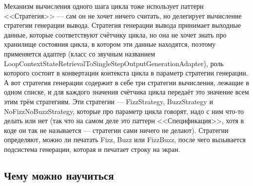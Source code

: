 \documentclass{../../text-style}
\begin{document}
Механизм вычисления одного шага цикла тоже использует паттерн <<Стратегия>> --- сам он не хочет ничего считать, но делегирует вычисление стратегии генерации вывода. Стратегия генерации вывода принимает выходные данные, которые соответствуют счётчику цикла, но она не хочет знать про хранилище состояния цикла, в котором эти данные находятся, поэтому применяется адаптер (класс со звучным названием LoopContextStateRetrievalToSingleStepOutputGenerationAdapter), роль которого состоит в конвертации контекста цикла в параметр стратегии генерации. А вот стратегия генерации содержит в себе три стратегии вычисления, лежащие в одном списке, и для каждого значения счётчика цикла передаёт это значение всем этим трём стратегиям. Эти стратегии --- FizzStrategy, BuzzStrategy и NoFizzNoBuzzStrategy, которые про параметр цикла говорят, надо с ним что-то делать или нет (так что на самом деле это паттерн <<Спецификация>>, хотя в коде он так не называется --- стратегии сами ничего не делают). Стратегии определяют, можно ли печатать Fizz, Buzz или FizzBuzz, после чего вызывается подсистема генерации, которая и печатает строку на экран.

\subsection{Чему можно научиться}
\end{document}
